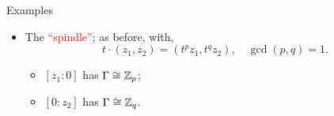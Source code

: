 \begin{frame}{Examples}
    \begin{itemize}
        \item The \textcolor{red}{``spindle''}; as before, with,
        \[
            t \cdot (z_{1}, z_{2}) = (t^{p}z_{1}, t^{q}z_{2}), \quad \gcd(p,q) = 1.
        \]

        \begin{itemize}
            \item $[z_{1}:0]$ has $\Gamma \cong \mathbb{Z}_{p}$;
            \item $[0:z_{2}]$ has $\Gamma \cong \mathbb{Z}_{q}$.
        \end{itemize}
    \end{itemize}
\end{frame}